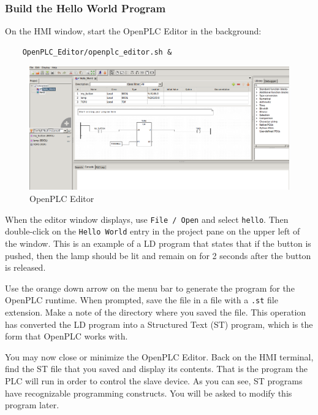 \subsubsection{Build the Hello World Program}
On the HMI window, start the OpenPLC Editor in the background:
\begin{verbatim}
    OpenPLC_Editor/openplc_editor.sh &
\end{verbatim}
\begin{figure}[H]
\begin{center}
\includegraphics [width=0.8\linewidth]{openplcEditor.png}
\end{center}
\caption{OpenPLC Editor}
\label{fig:editor}
\end{figure}

When the editor window displays, use {\tt File / Open} and select {\tt hello}.  Then double-click on the
{\tt Hello World} entry in the project pane on the upper left of the window.  This is an example of a LD program that 
states that if the button is pushed, then the lamp should be lit and remain on for 2 seconds after the button is
released.  

Use the orange down arrow on the menu bar to generate the program for the OpenPLC runtime.  When prompted, save the 
file in a file with a {\tt .st} file extension.  Make a note of the directory where you saved the file.  This operation
has converted the LD program into a Structured Text (ST) program, which is the form that OpenPLC works with.

You may now close or minimize the OpenPLC Editor.  Back on the HMI terminal, find the ST file that you saved 
and display its contents.  That is the program the PLC will run in order to control the slave device.  As you can see,
ST programs have recognizable programming constructs.  You will be asked to modify this program later.

